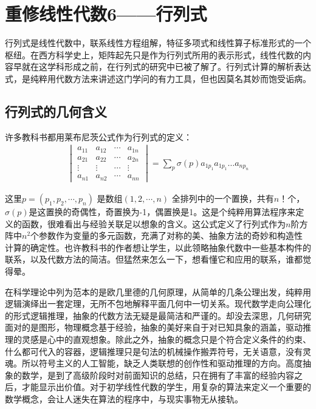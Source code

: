 \section{重修线性代数6——行列式}
	行列式是线性代数中，联系线性方程组解，特征多项式和线性算子标准形式的一个枢纽。在西方科学史上，矩阵起先只是作为行列式所用的表示形式，线性代数的内容早就在这学科形成之前，在行列式的研究中已被了解了。行列式计算的解析表达式，是纯粹用代数方法来讲述这门学问的有力工具，但也因莫名其妙而饱受诟病。
	
	\subsection{行列式的几何含义}
	
	许多教科书都用莱布尼茨公式作为行列式的定义：
	\begin{gather*}
		\begin{vmatrix}a_{11}& a_{12}&\cdots& a_{1n} \\a_{21}& a_{22}&\cdots& a_{2n} \\ \vdots & \vdots&\cdots&\vdots \\a_{n1}& a_{n2} &\cdots& a_{nn}  \end{vmatrix} = \sum_{p}\sigma (p) a_{1p_1}a_{1 p_1}\dots a_{n p_n}
	\end{gather*}

	这里$ p=(p_1,p_2,\cdots, p_n) $ 是数组$  (1, 2,\cdots, n) $ 全排列中的一个置换，共有$ n！ $个，$ \sigma(p) $是这置换的奇偶性，奇置换为-1，偶置换是1。这是个纯粹用算法程序来定义的函数，很难看出与经验关联足以想象的含义。这公式定义了行列式作为$ n $阶方阵中$ n^2 $个参数作为变量的多元函数，充满了对称的美、抽象方法的奇妙和构造性计算的确定性。也许教科书的作者想让学生，以此领略抽象代数中一些基本构件的联系，以及代数方法的简洁。但猛然来怎么一下，想看懂它和应用的联系，谁都觉得晕。
	
	在科学理论中列为范本的是欧几里德的几何原理，从简单的几条公理出发，纯粹用逻辑演绎出一套定理，无所不包地解释平面几何中一切关系。现代数学走向公理化的形式逻辑推理，抽象的代数方法无疑是最简洁和严谨的。却没去深思，几何研究面对的是图形，物理概念基于经验，抽象的美好来自于对已知具象的涵盖，驱动推理的灵感是心中的直观想象。除此之外，抽象的概念只是个符合定义条件的约束、什么都可代入的容器，逻辑推理只是句法的机械操作搬弄符号，无关语意，没有灵魂。所以符号主义的人工智能，缺乏人类联想的创作性和驱动推理的方向。高度抽象的数学，是到了高级阶段时对前面知识的总结，只在拥有了丰富的经验内容之后，才能显示出价值。对于初学线性代数的学生，用复杂的算法来定义一个重要的数学概念，会让人迷失在算法的程序中，与现实事物无从接轨。
	
